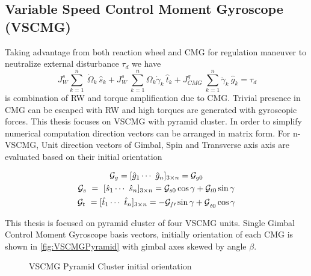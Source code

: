 \subsection{Variable Speed Control Moment Gyroscope (VSCMG)}

Taking advantage from both reaction wheel and CMG for regulation maneuver to neutralize external disturbance $\displaystyle \tau _{d}$ we have
\begin{equation}
\ J^{s}_{W}\sum ^{n}_{k=1} \ \dot{\Omega }_{k} \ \hat{s}_{k} +J^{s}_{W} \ \sum ^{n}_{k=1} \Omega _{k}\dot{\gamma }_{k} \ \hat{t}_{k} +J^{g}_{CMG} \ \sum ^{n}_{k=1}\ddot{\gamma }_{k} \ \hat{g}_{k} =\tau _{d}
\end{equation}
is combination of RW and torque amplification due to CMG. Trivial presence in CMG can be escaped with RW and high torques are generated with gyroscopic forces. This thesis focuses on VSCMG with pyramid cluster. In order to simplify numerical computation direction vectors can be arranged in matrix form. For n-VSCMG, Unit direction vectors of Gimbal, Spin and Transverse axis axis are evaluated based on their initial orientation

\begin{gather}
\mathcal{G}_{g} =[\hat{g}_{1} \cdots \ \hat{g}_{n}]_{3\times n} =\mathcal{G}_{g0} \notag\\
\mathcal{G}_{s} \ =\ [\hat{s}_{1} \cdots \ \hat{s}_{n}]_{3\times n} =\mathcal{G}_{s0}\cos \gamma +\mathcal{G}_{t0}\sin \gamma  \notag\\
\mathcal{G}_{t} \ =[\hat{t}_{1} \cdots \ \hat{t}_{n}]_{3\times n} =\mathcal{- G_{s0}\sin \gamma +G}_{t0}\cos \gamma 
\end{gather}

This thesis is focused on pyramid cluster of four VSCMG units. Single Gimbal Control Moment Gyroscope basis vectors, initially orientation of each CMG is shown in \autoref{fig:VSCMGPyramid} with gimbal axes skewed by angle $\beta$.


\begin{figure}[h]
\centering

\caption{VSCMG Pyramid Cluster initial orientation}
\label{fig:VSCMGPyramid}
\end{figure}

